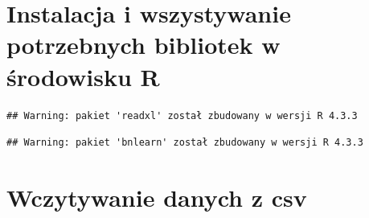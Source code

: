 \documentclass[
]{article}
\begin{document}
\section{Instalacja i wszystywanie potrzebnych bibliotek w środowisku
R}\label{instalacja-i-wszystywanie-potrzebnych-bibliotek-w-ux15brodowisku-r}

\begin{verbatim}
## Warning: pakiet 'readxl' został zbudowany w wersji R 4.3.3
\end{verbatim}

\begin{verbatim}
## Warning: pakiet 'bnlearn' został zbudowany w wersji R 4.3.3
\end{verbatim}

\section{Wczytywanie danych z csv}\label{wczytywanie-danych-z-csv}
\end{document}
